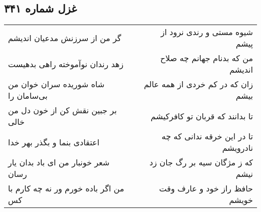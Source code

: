 \begin{center}
\section*{غزل شماره ۳۴۱}
\label{sec:sh341}
\begin{longtable}{l p{0.5cm} r}
گر من از سرزنش مدعیان اندیشم
&&
شیوه مستی و رندی نرود از پیشم
\\
زهد رندان نوآموخته راهی بدهیست
&&
من که بدنام جهانم چه صلاح اندیشم
\\
شاه شوریده سران خوان من بی‌سامان را
&&
زان که در کم خردی از همه عالم بیشم
\\
بر جبین نقش کن از خون دل من خالی
&&
تا بدانند که قربان تو کافرکیشم
\\
اعتقادی بنما و بگذر بهر خدا
&&
تا در این خرقه ندانی که چه نادرویشم
\\
شعر خونبار من ای باد بدان یار رسان
&&
که ز مژگان سیه بر رگ جان زد نیشم
\\
من اگر باده خورم ور نه چه کارم با کس
&&
حافظ راز خود و عارف وقت خویشم
\\
\end{longtable}
\end{center}
